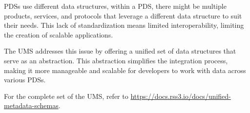 \glspl{PDS} use different data structures, within a \gls{PDS}, there might be multiple products, services, and protocols that leverage a different data structure to suit their needs.
This lack of standardization means limited interoperability, limiting the creation of scalable applications.

The \gls{UMS} addresses this issue by offering a unified set of data structures that serve as an abstraction.
This abstraction simplifies the integration process, making it more manageable and scalable for developers to work with data across various \glspl{PDS}.

For the complete set of the \gls{UMS}, refer to \url{https://docs.rss3.io/docs/unified-metadata-schemas}.

